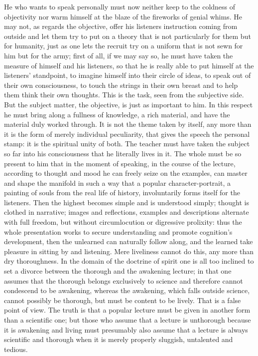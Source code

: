 \documentclass[12pt,a4paper,openany]{book}
\newcommand{\opage}[1]{\marginnote{\footnotesize\textit{[#1]}}}
\begin{document}
He who wants to speak personally must now neither keep
to the coldness of objectivity nor warm himself at the blaze of
the fireworks of genial whims. He may not, as regards the
\setcounter{footnote}{0}%
\opage{439}objective, offer his listeners instruction coming from outside
and let them try to put on
a theory that is not particularly for them but for
humanity, just as one lets the recruit try on a
uniform that is not sewn for him but for the army;
first of all, if we may say so, he must have taken the measure
of himself and his listeners, so that he is really able
to put himself at the listeners' standpoint, to imagine
himself into their circle of ideas, to speak out of their own
consciousness, to touch the strings in their own breast and to help
them think their own thoughts. This is the task,
seen from the subjective side. But the subject matter, the objective,
is just as important to him. In this respect he must
bring along a fullness of knowledge, a rich
material, and have the material duly worked through. It
is not the theme taken by itself, any more than it is the form of
merely individual peculiarity, that gives the speech
the personal stamp: it is the spiritual unity of
both. The teacher must have taken the subject so far
into his consciousness that he literally lives in it. The
whole must be so present to him that in the moment
of speaking, in the course of the lecture, according to thought and
mood he can freely seize on the examples, can master and
shape the manifold in such a way that a popular character-portrait,
a painting of souls from the real life of history,
involuntarily forms itself for the listeners. Then the
highest becomes simple and is understood simply; thought is clothed in
narrative; images and reflections, examples and
descriptions alternate with full freedom, but without circumlocution
or digressive prolixity: thus the whole
presentation works to secure understanding and promote
\setcounter{footnote}{0}%
\opage{440}cognition's development, then the unlearned can naturally
follow along, and the learned take pleasure in sitting
by and listening. Mere liveliness cannot do
this, any more than dry thoroughness. In the domain of the doctrine of spirit
one is all too inclined to set a divorce
between the thorough and the awakening lecture; in that one assumes that the thorough belongs exclusively
to science and therefore cannot condescend
to be awakening, whereas the awakening, which falls
outside science, cannot possibly be thorough, but
must be content to be lively. That is a false point of view.
The truth is that a popular lecture must be
given in another form than a scientific one; but those
who assume that a lecture is unthorough because it is
awakening and living must presumably also assume that a
lecture is always scientific and thorough when it
is merely properly sluggish, untalented and tedious.
\end{document}
